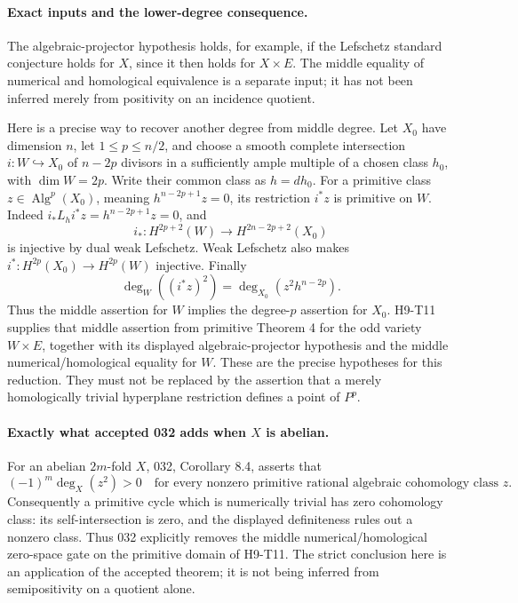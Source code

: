 \paragraph{Exact inputs and the lower-degree consequence.}
The algebraic-projector hypothesis holds, for example, if the
Lefschetz standard conjecture holds for $X$, since it then holds for
$X\times E$. The middle equality of numerical and homological
equivalence is a separate input; it has not been inferred merely from
positivity on an incidence quotient.

Here is a precise way to recover another degree from middle degree.
Let $X_0$ have dimension $n$, let $1\le p\le n/2$, and choose a smooth
complete intersection $i:W\hookrightarrow X_0$ of $n-2p$ divisors
in a sufficiently ample multiple of a chosen class $h_0$, with
$\dim W=2p$. Write their common class as $h=d h_0$.
For a primitive class $z\in\operatorname{Alg}^p(X_0)$, meaning
$h^{n-2p+1}z=0$, its restriction $i^*z$ is primitive on $W$.
Indeed $i_*L_h i^*z=h^{n-2p+1}z=0$, and
\[
 i_*:H^{2p+2}(W)\longrightarrow H^{2n-2p+2}(X_0)
\]
is injective by dual weak Lefschetz. Weak Lefschetz also makes
$i^*:H^{2p}(X_0)\to H^{2p}(W)$ injective. Finally
\[
 \deg_W((i^*z)^2)=\deg_{X_0}(z^2h^{n-2p}).
\]
Thus the middle assertion for $W$ implies the degree-$p$ assertion
for $X_0$. H9-T11 supplies that middle assertion from primitive
Theorem 4 for the odd variety $W\times E$, together with its displayed
algebraic-projector hypothesis and the middle numerical/homological
equality for $W$. These are the precise hypotheses for this reduction.
They must not be replaced by the assertion that a merely homologically
trivial hyperplane restriction defines a point of $P^p$.

\paragraph{Exactly what accepted 032 adds when $X$ is abelian.}
For an abelian $2m$-fold $X$, 032, Corollary 8.4, asserts that
\[
 (-1)^m\deg_X(z^2)>0
 \quad\text{for every nonzero primitive rational algebraic
 cohomology class }z.
\]
Consequently a primitive cycle which is numerically trivial has zero
cohomology class: its self-intersection is zero, and the displayed
definiteness rules out a nonzero class. Thus 032 explicitly removes
the middle numerical/homological zero-space gate on the primitive
domain of H9-T11. The strict conclusion here is an application of
the accepted theorem; it is not being inferred from semipositivity
on a quotient alone.

